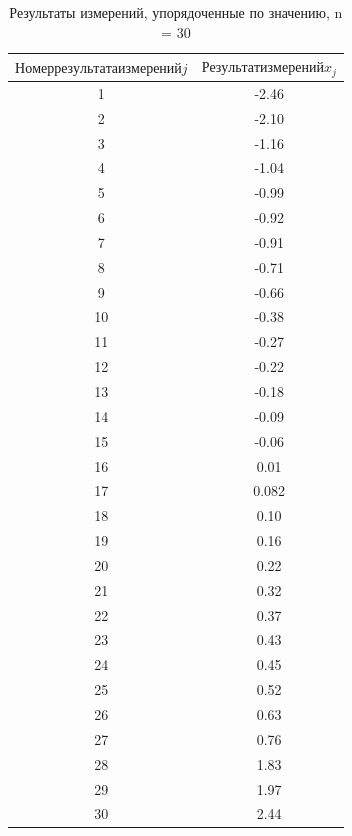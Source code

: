 \begin{table} [h]
\begin{center}
\begin{tabular}{|c|c|}
	\hline
	$Номер результата измерений j$ & $Результат измерений x_j$\\
	\hline
	1 & -2.46 \\ \hline
2 & -2.10 \\ \hline
3 & -1.16 \\ \hline
4 & -1.04 \\ \hline
5 & -0.99 \\ \hline
6 & -0.92 \\ \hline
7 & -0.91 \\ \hline
8 & -0.71 \\ \hline
9 & -0.66 \\ \hline
10 & -0.38 \\ \hline
11 & -0.27 \\ \hline
12 & -0.22 \\ \hline
13 & -0.18 \\ \hline
14 & -0.09 \\ \hline
15 & -0.06 \\ \hline
16 & 0.01 \\ \hline
17 & 0.082 \\ \hline
18 & 0.10 \\ \hline
19 & 0.16 \\ \hline
20 & 0.22 \\ \hline
21 & 0.32 \\ \hline
22 & 0.37 \\ \hline
23 & 0.43 \\ \hline
24 & 0.45 \\ \hline
25 & 0.52 \\ \hline
26 & 0.63 \\ \hline
27 & 0.76 \\ \hline
28 & 1.83 \\ \hline
29 & 1.97 \\ \hline
30 & 2.44 \\ \hline
\end{tabular}
\end{center}
\caption{Результаты измерений, упорядоченные по значению, n = 30}
\end{table} 

